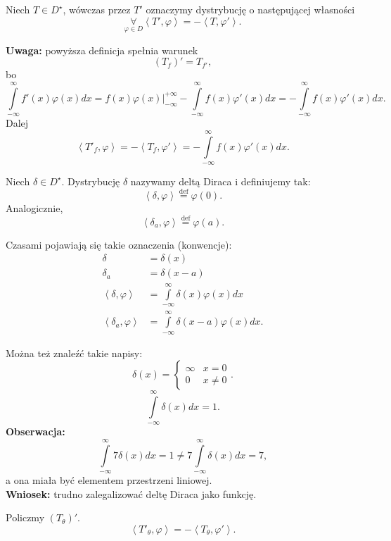 \documentclass[../main.tex]{subfiles}
\begin{document}
\pagebreak
\begin{definicja}
    Niech $T\in D^\star$, wówczas przez $T'$ oznaczymy dystrybucję o następującej własności
    \[
        \underset{\varphi\in D}{\forall} \left<T', \varphi \right> = -\left<T, \varphi' \right>
    .\]
\end{definicja}
\textbf{Uwaga: } powyższa definicja spełnia warunek
\[
    \left( T_f \right)' = T_{f'}
,\]
bo
\[
    \int\limits_{-\infty}^{\infty} f'(x)\varphi(x)dx = f(x)\varphi(x)\Big|_{-\infty}^{+\infty} - \int\limits_{-\infty}^{\infty} f(x)\varphi'(x) dx = -\int\limits_{-\infty}^{\infty} f(x)\varphi'(x)dx
.\]
Dalej
\[
    \left<T'_f, \varphi \right> = -\left<T_{f}, \varphi' \right> = -\int\limits_{-\infty}^{\infty} f(x)\varphi'(x)dx
.\]
\begin{definicja}
    Niech $\delta \in D^\star$. Dystrybucję $\delta$ nazywamy deltą Diraca i definiujemy tak:
    \[
        \left<\delta, \varphi \right> \overset{\text{def}}{=} \varphi(0)
    .\]
Analogicznie,
\[
    \left<\delta_a, \varphi \right>\overset{\text{def}}{=} \varphi(a)
.\]
\end{definicja}
\begin{definicja}
Czasami pojawiają się takie oznaczenia (konwencje):
\begin{align*}
    \delta &= \delta(x)\\
    \delta_a &= \delta(x-a)\\
    \left<\delta, \varphi \right> &= \int\limits_{-\infty}^{\infty} \delta(x)\varphi(x)dx\\
    \left<\delta_a, \varphi \right> &= \int\limits_{-\infty}^{\infty} \delta(x-a)\varphi(x)dx
.\end{align*}
\end{definicja}
\begin{definicja}
    Można też znaleźć takie napisy:
\[
    \delta(x) = \begin{cases}
        \infty & x = 0\\
        0 & x \neq 0
    \end{cases}
.\]
\[
    \int\limits_{-\infty}^{\infty} \delta(x)dx = 1
.\]
\textbf{Obserwacja:}
\[
    \int\limits_{-\infty}^{\infty} 7\delta(x)dx = 1 \neq 7 \int\limits_{-\infty}^{\infty} \delta(x)dx = 7
,\]
a ona miała być elementem przestrzeni liniowej.\\
\textbf{Wniosek:} trudno zalegalizować deltę Diraca jako funkcję.

\end{definicja}
Policzmy $\left( T_\theta \right)'$.
\[
    \left<T'_{\theta}, \varphi \right> =- \left<T_\theta, \varphi' \right>
.\]
\end{document}
